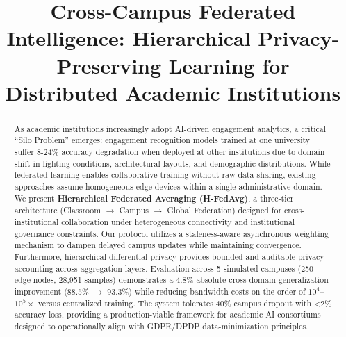\documentclass[conference]{IEEEtran}
\begin{document}
\title{Cross-Campus Federated Intelligence: Hierarchical Privacy-Preserving Learning for Distributed Academic Institutions}

\author{
}

\maketitle

\begin{abstract}
As academic institutions increasingly adopt AI-driven engagement analytics, a critical ``Silo Problem'' emerges: engagement recognition models trained at one university suffer 8-24\% accuracy degradation when deployed at other institutions due to domain shift in lighting conditions, architectural layouts, and demographic distributions. While federated learning enables collaborative training without raw data sharing, existing approaches assume homogeneous edge devices within a single administrative domain. We present \textbf{Hierarchical Federated Averaging (H-FedAvg)}, a three-tier architecture (Classroom $\rightarrow$ Campus $\rightarrow$ Global Federation) designed for cross-institutional collaboration under heterogeneous connectivity and institutional governance constraints. Our protocol utilizes a staleness-aware asynchronous weighting mechanism to dampen delayed campus updates while maintaining convergence. Furthermore, hierarchical differential privacy provides bounded and auditable privacy accounting across aggregation layers. Evaluation across 5 simulated campuses (250 edge nodes, 28,951 samples) demonstrates a 4.8\% absolute cross-domain generalization improvement (88.5\% $\rightarrow$ 93.3\%) while reducing bandwidth costs on the order of $10^4$--$10^5\times$ versus centralized training. The system tolerates 40\% campus dropout with <2\% accuracy loss, providing a production-viable framework for academic AI consortiums designed to operationally align with GDPR/DPDP data-minimization principles.
\end{abstract}
\end{document}
